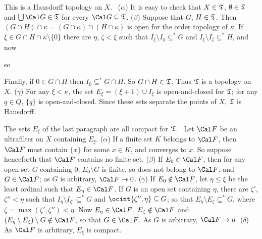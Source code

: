{

\medskip

 This is a Hausdorff topology on $X$.   \Prf\ ($\alpha$)
It is easy to check that $X\in\frak T$, $\emptyset\in\frak T$ and
$\bigcup\Cal G\in\frak T$ for every $\Cal G\subseteq\frak T$.
($\beta$) Suppose that $G$, $H\in\frak T$.   Then $(G\cap H)\cap\kappa
=(G\cap\kappa)\cap(H\cap\kappa)$ is open for the order topology of
$\kappa$.   If $\xi\in G\cap H\cap\kappa\setminus\{0\}$ there are
$\eta$, $\zeta<\xi$ such that $I_{\xi}\setminus I_{\eta}\subseteq^*G$
and $I_{\xi}\setminus I_{\zeta}\subseteq^*H$, and now


\noindent so


\noindent Finally, if $0\in G\cap H$ then $I_0\subseteq^*G\cap H$.   So
$G\cap H\in\frak T$.   Thus $\frak T$ is a topology on $X$.   ($\gamma$)
For any $\xi<\kappa$, the set $E_{\xi}=(\xi+1)\cup I_{\xi}$ is
open-and-closed for $\frak T$;  for any $q\in Q$, $\{q\}$ is
open-and-closed.   Since these sets separate the points of $X$,
$\frak  T$ is Hausdorff.\ \Qed

\medskip

 The sets $E_{\xi}$ of the last paragraph are all compact
for $\frak T$.   \Prf\ Let $\Cal F$ be an ultrafilter on $X$ containing
$E_{\xi}$.   ($\alpha$) If a finite set $K$ belongs to $\Cal F$, then
$\Cal F$ must contain $\{x\}$ for some $x\in K$, and converges to $x$.
So suppose henceforth that $\Cal F$ contains no finite set.   ($\beta$)
If $E_0\in\Cal F$, then for any open set $G$ containing $0$,
$E_0\setminus G$ is finite, so does not belong to $\Cal F$, and
$G\in\Cal F$;  as $G$ is
arbitrary, $\Cal F\to 0$.   ($\gamma$) If $E_0\notin\Cal F$, let
$\eta\le\xi$ be the least ordinal such that $E_{\eta}\in\Cal F$.   If
$G$ is an open set containing $\eta$, there are $\zeta'$, $\zeta''<\eta$
such that $I_{\eta}\setminus I_{\zeta'}\subseteq^*G$ and
$\ocint{\zeta'',\eta}\subseteq G$;  so that
$E_{\eta}\setminus E_{\zeta}\subseteq^*G$,
where $\zeta=\max(\zeta',\zeta'')<\eta$.   Now
$E_{\eta}\in\Cal F$, $E_{\zeta}\notin\Cal F$ and $(E_{\eta}\setminus
E_{\zeta})\setminus G\notin\Cal F$, so that $G\in\Cal F$.   As $G$ is
arbitrary, $\Cal F\to\eta$.   ($\delta$) As $\Cal F$ is arbitrary,
$E_{\xi}$ is compact.\ \Qed

}
